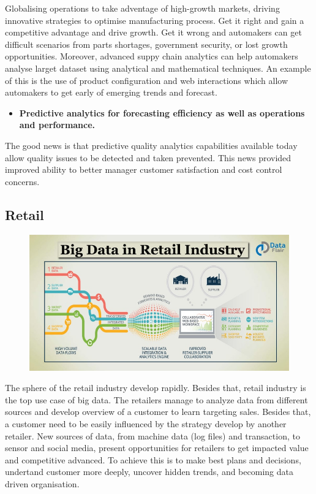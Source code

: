 \documentclass[]{book}
\providecommand{\tightlist}{%
  \setlength{\itemsep}{0pt}\setlength{\parskip}{0pt}}
\begin{document}
Globalising operations to take adventage of high-growth markets, driving
innovative strategies to optimise manufacturing process. Get it right
and gain a competitive advantage and drive growth. Get it wrong and
automakers can get difficult scenarios from parts shortages, government
security, or lost growth opportunities. Moreover, advanced suppy chain
analytics can help automakers analyse larget dataset using analytical
and mathematical techniques. An example of this is the use of product
configuration and web interactions which allow automakers to get early
of emerging trends and forecast.

\begin{itemize}
\tightlist
\item
  \textbf{Predictive analytics for forecasting efficiency as well as
  operations and performance.}
\end{itemize}

The good news is that predictive quality analytics capabilities
available today allow quality issues to be detected and taken prevented.
This news provided improved ability to better manager customer
satisfaction and cost control concerns.

\subsection{Retail}\label{retail}

\begin{figure}
\centering
\includegraphics{16.jpg}
\caption{}
\end{figure}

The sphere of the retail industry develop rapidly. Besides that, retail
industry is the top use case of big data. The retailers manage to
analyze data from different sources and develop overview of a customer
to learn targeting sales. Besides that, a customer need to be easily
influenced by the strategy develop by another retailer. New sources of
data, from machine data (log files) and transaction, to sensor and
social media, present opportunities for retailers to get impacted value
and competitive advanced. To achieve this is to make best plans and
decisions, undertand customer more deeply, uncover hidden trends, and
becoming data driven organisation.
\end{document}
